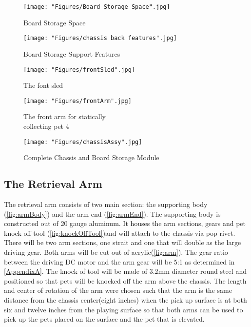 \documentclass[11pt, oneside]{article} %
\begin{document}
		\begin{figure}[!ht]
			\centering
			\begin{minipage}[t]{.5\textwidth}
				\centering
				\texttt{[image: "Figures/Board Storage Space".jpg]}
				\caption[Board Storage Space]{Board Storage Space}
				\label{fig:2}
			\end{minipage}%
			\begin{minipage}[t]{.5\textwidth}
				\centering
				\texttt{[image: "Figures/chassis back features".jpg]}
				\caption[Board Storage Support Features]{Board Storage Support Features}
				\label{fig:3}
			\end{minipage}
		\end{figure}
		
		\begin{figure}[!ht]
			\begin{minipage}[t]{.5\textwidth}
				\centering
				\texttt{[image: "Figures/frontSled".jpg]}
				\caption[The Sled]{The font sled}
				\label{fig:front sled}
			\end{minipage}%
			\begin{minipage}[t]{.75\textwidth}
				\centering
				\texttt{[image: "Figures/frontArm".jpg]}
				\caption[Front Arm]{The front arm for statically \\ collecting pet 4}
				\label{fig:front arm}
			\end{minipage}
		\end{figure}
		
		\begin{figure}[!ht]
			\centering
			\texttt{[image: "Figures/chassisAssy".jpg]}
			\caption[Complete Chassis and Board Storage Module]{Complete Chassis and Board Storage Module}
			\label{fig:chassisAssy}
		\end{figure}
		
	\subsection{The Retrieval Arm}
	The retrieval arm consists of two main section: the supporting body (\autoref{fig:armBody}) and the arm end (\autoref{fig:armEnd}). The supporting body is constructed out of 20 gauge aluminum. It houses the arm sections, gears and pet knock off tool (\autoref{fig:knockOffTool})and will attach to the chassis via pop rivet. There will be two arm sections, one strait and one that will double as the large driving gear. Both arms will be cut out of acrylic(\autoref{fig:arm}). The gear ratio between the driving DC motor and the arm gear will be 5:1 as determined in \autoref{AppendixA}. The knock of tool will be made of 3.2mm diameter round steel and positioned so that pets will be knocked off the arm above the chassis. The length and center of rotation of the arm were chosen such that the arm is the same distance from the chassis center(eight inches) when the pick up surface is at both six and twelve inches from the playing surface so that both arms can be used to pick up the pets placed on the surface and the pet that is elevated.
	
\end{document}
